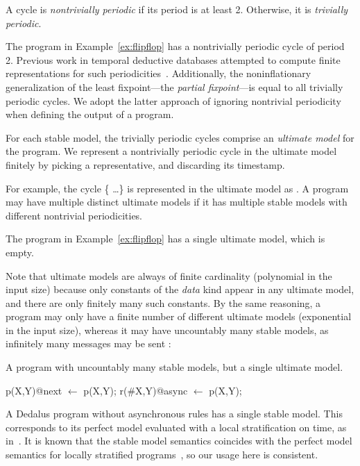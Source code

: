 \begin{definition}
A cycle is {\em nontrivially periodic} if its period is at least 2.  Otherwise, it is {\em trivially periodic}.
\end{definition}

The program in Example~\ref{ex:flipflop} has a nontrivially periodic cycle of period 2.  Previous work in temporal deductive databases attempted to compute finite representations for such periodicities~\cite{tdd-infinite}.  Additionally, the noninflationary generalization of the least fixpoint---the {\em partial fixpoint}---is equal to all trivially periodic cycles.  We adopt the latter approach of ignoring nontrivial periodicity when defining the output of a \lang program.

\begin{definition}
For each stable model, the trivially periodic cycles comprise an {\em ultimate model} for the program.  We represent a nontrivially periodic cycle in the ultimate model finitely by picking a representative, and discarding its timestamp.
\end{definition}

For example, the cycle \{ \ldots\} is represented in the ultimate model as .  A program may have multiple distinct ultimate models if it has multiple stable models with different nontrivial periodicities.

The program in Example~\ref{ex:flipflop} has a single ultimate model, which is empty.

Note that ultimate models are always of finite cardinality (polynomial in the input size) because only constants of the {\em data} kind appear in any ultimate model, and there are only finitely many such constants.  By the same reasoning, a \lang program may only have a finite number of different ultimate models (exponential in the input size), whereas it may have uncountably many stable models, as infinitely many messages may be sent :

\begin{example}
A \lang program with uncountably many stable models, but a single ultimate model.

\begin{Dedalus}
p(X,Y)@next \(\leftarrow\) p(X,Y);
r(#X,Y)@async \(\leftarrow\) p(X,Y);
\end{Dedalus}
\end{example}

A Dedalus program without asynchronous rules has a single stable model.  This corresponds to its perfect model evaluated with a local stratification on time, as in~\cite{deductiveupdates}.  It is known that the stable model semantics coincides with the perfect model semantics for locally stratified programs~\cite{stable-model}, so our usage here is consistent.

